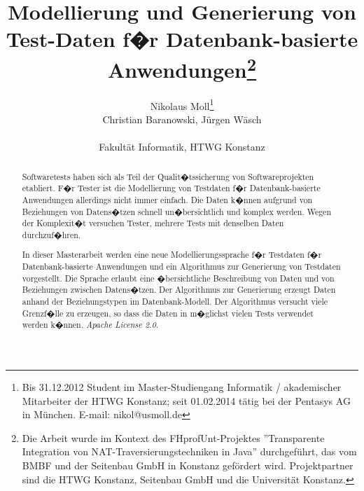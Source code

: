 \documentclass{lni}
\author{
	Nikolaus Moll\footnote{Bis 31.12.2012 Student im Master-Studiengang Informatik / akademischer Mitarbeiter der HTWG Konstanz; seit 01.02.2014 t\"atig bei der Pentasys AG in München. E-mail: nikol@usmoll.de}\\ Christian Baranowski, J\"urgen W\"asch \\ 
	\\ 
	Fakult\"at Informatik, 
	HTWG Konstanz \\ 
}
\title{Modellierung und Generierung von Test-Daten f�r Datenbank-basierte Anwendungen\footnote{Die Arbeit wurde im Kontext des FHprofUnt-Projektes ''Transparente Integration von NAT-Traversierungstechniken in Java'' durchgef\"uhrt, das vom BMBF und der Seitenbau GmbH in Konstanz gef\"ordert wird. Projektpartner sind die HTWG Konstanz, Seitenbau GmbH und die Universit\"at Konstanz.}}
\begin{document}
\maketitle




\begin{abstract}
Softwaretests haben sich als Teil der Qualit�tssicherung von Softwareprojekten etabliert.
F�r Tester ist die Modellierung von Testdaten f�r Datenbank-basierte Anwendungen allerdings
nicht immer einfach. Die Daten k�nnen aufgrund von Beziehungen von Datens�tzen schnell
un�bersichtlich und komplex werden. Wegen der Komplexit�t versuchen Tester, mehrere Tests
mit denselben Daten durchzuf�hren.

In dieser Masterarbeit werden eine neue Modellierungssprache f�r Testdaten f�r
Datenbank-basierte Anwendungen und ein Algorithmus zur Generierung von Testdaten 
vorgestellt. Die Sprache erlaubt eine �bersichtliche Beschreibung von Daten und
von Beziehungen zwischen Datens�tzen. Der Algorithmus zur Generierung erzeugt
Daten anhand der Beziehungstypen im Datenbank-Modell. Der Algorithmus versucht
viele Grenzf�lle zu erzeugen, so dass die Daten in m�glichst vielen Tests verwendet
werden k�nnen.
\textit{Apache License 2.0}.

\end{abstract}













\end{document}
